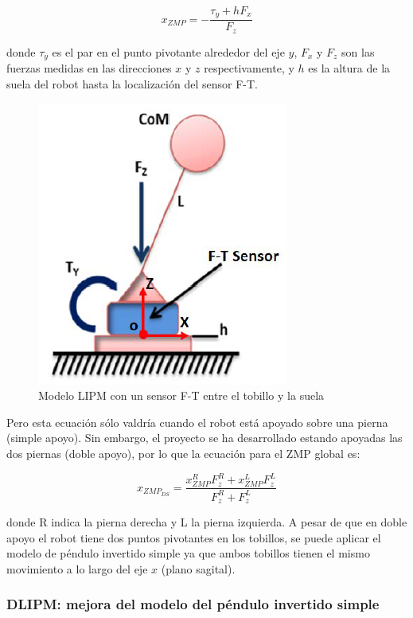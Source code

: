 \begin{equation}
x_{ZMP}=-\frac{\tau_y + h F_x}{F_z}
\label{ec422}
\end{equation}

donde $\tau_y$ es el par en el punto pivotante alrededor del eje $y$, $F_x$ y $F_z$ son las fuerzas medidas en las direcciones $x$ y $z$ respectivamente, y $h$ es la altura de la suela del robot hasta la localización del sensor F-T.

\begin{figure}[H]
\centering
\includegraphics[scale=0.8]{imagenes/apartado_4/44_LIPM_TEO}
\caption{Modelo LIPM con un sensor F-T entre el tobillo y la suela}
\label{figura44}
\end{figure}

Pero esta ecuación sólo valdría cuando el robot está apoyado sobre una pierna (simple apoyo). Sin embargo, el proyecto se ha desarrollado estando apoyadas las dos piernas (doble apoyo), por lo que la ecuación para el ZMP global es:


\begin{equation}
x_{ZMP_{DS}}=\frac{x_{ZMP}^{R}F_{z}^{R}+x_{ZMP}^{L}F_{z}^{L}}{F_{z}^{R}+F_{z}^{L}}
\label{ec423}
\end{equation}

donde R indica la pierna derecha y L la pierna izquierda. A pesar de que en doble apoyo el robot tiene dos puntos pivotantes en los tobillos, se puede aplicar el modelo de péndulo invertido simple ya que ambos tobillos tienen el mismo movimiento a lo largo del eje $x$ (plano sagital).

\subsubsection{DLIPM: mejora del modelo del péndulo invertido simple}

